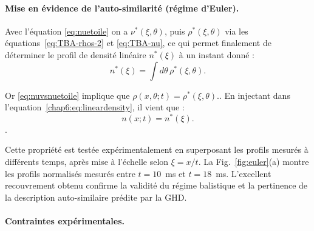


\paragraph{Mise en évidence de l’auto-similarité (régime d’Euler).}
Avec l'équation \eqref{eq:nuetoile} on a $\nu^*(\xi,\theta)$, puis $\rho^\ast(\xi,\theta)$ via les équations~\eqref{eq:TBA-rhos-2} et \eqref{eq:TBA-nu}, ce qui permet finalement de déterminer le profil de densité linéaire $n^\ast(\xi)$ à un instant donné : 
\begin{equation}
    n^\ast(\xi) = \int d\theta \, \rho^\ast(\xi,\theta).
    \label{chap6:eq:lineardensity}
\end{equation}


Or \eqref{eq:nuvsnuetoile} implique que 
\(
\rho(x,\theta;t) = \rho^\ast(\xi,\theta).
\).
En injectant dans l'equation~\eqref{chap6:eq:lineardensity}, il vient que  :
\begin{equation}
	n(x;t) = n^\ast\left( \xi \right).
\end{equation}
.

\medskip

Cette propriété est testée expérimentalement en superposant les profils mesurés à différents temps, après mise à l’échelle selon $\xi = x/t$. La Fig.~\ref{fig:euler}(a) montre les profils normalisés mesurés entre $t = 10$~ms et $t = 18$~ms. L’excellent recouvrement obtenu confirme la validité du régime balistique et la pertinence de la description auto-similaire prédite par la \gls*{GHD}.

\paragraph{Contraintes expérimentales.}


